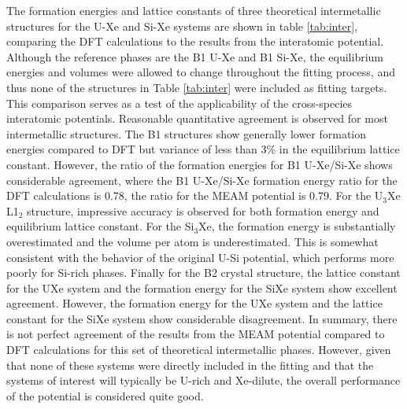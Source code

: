 \documentclass[review]{elsarticle}
\begin{document}
The formation energies and lattice constants of three theoretical intermetallic structures for the U-Xe and Si-Xe systems are shown in table \ref{tab:inter}, comparing the DFT calculations to the results from the interatomic potential. Although the reference phases are the B1 U-Xe and B1 Si-Xe, the equilibrium energies and volumes were allowed to change throughout the fitting process, and thus none of the structures in Table \ref{tab:inter} were included as fitting targets. This comparison serves as a test of the applicability of the cross-species interatomic potentials. Reasonable quantitative agreement is observed for most intermetallic structures. The B1 structures show generally lower formation energies compared to DFT but variance of less than 3\% in the equilibrium lattice constant. However, the ratio of the formation energies for B1 U-Xe/Si-Xe shows considerable agreement, where the B1 U-Xe/Si-Xe formation energy ratio for the DFT calculations is 0.78, the ratio for the MEAM potential is 0.79. For the U$_3$Xe L1$_2$ structure, impressive accuracy is observed for both formation energy and equilibrium lattice constant. For the Si$_3$Xe, the formation energy is substantially overestimated and the volume per atom is underestimated. This is somewhat consistent with the behavior of the original U-Si potential, which performs more poorly for Si-rich phases. Finally for the B2 crystal structure, the lattice constant for the UXe system and the formation energy for the SiXe system show excellent agreement. However, the formation energy for the UXe system and the lattice constant for the SiXe system show considerable disagreement. In summary, there is not perfect agreement of the results from the MEAM potential compared to DFT calculations for this set of theoretical intermetallic phases. However, given that none of these systems were directly included in the fitting and that the systems of interest will typically be U-rich and Xe-dilute, the overall performance of the potential is considered quite good. 

\end{document}
